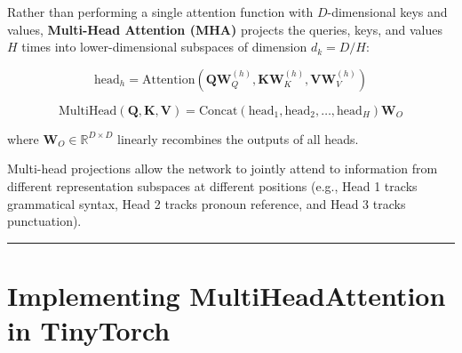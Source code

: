 \documentclass[
  letterpaper,
]{scrbook}
\begin{document}
Rather than performing a single attention function with
\(D\)-dimensional keys and values, \textbf{Multi-Head Attention (MHA)}
projects the queries, keys, and values \(H\) times into
lower-dimensional subspaces of dimension \(d_k = D / H\):

\[\text{head}_h = \text{Attention}(\mathbf{Q} \mathbf{W}_Q^{(h)}, \mathbf{K} \mathbf{W}_K^{(h)}, \mathbf{V} \mathbf{W}_V^{(h)})\]

\[\text{MultiHead}(\mathbf{Q}, \mathbf{K}, \mathbf{V}) = \text{Concat}(\text{head}_1, \text{head}_2, \dots, \text{head}_H) \mathbf{W}_O\]

where \(\mathbf{W}_O \in \mathbb{R}^{D \times D}\) linearly recombines
the outputs of all heads.

Multi-head projections allow the network to jointly attend to
information from different representation subspaces at different
positions (e.g., Head 1 tracks grammatical syntax, Head 2 tracks pronoun
reference, and Head 3 tracks punctuation).

\begin{center}\rule{0.5\linewidth}{0.5pt}\end{center}

\section{Implementing MultiHeadAttention in
TinyTorch}\label{implementing-multiheadattention-in-tinytorch}
\end{document}
